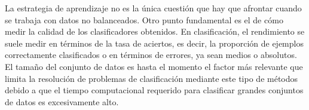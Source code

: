 			La estrategia de aprendizaje no es la única cuestión que hay que afrontar cuando se trabaja con datos no balanceados. Otro punto fundamental es el de cómo medir la calidad de los clasificadores obtenidos. En clasificación, el rendimiento se suele medir en términos de la tasa de aciertos, es decir, la proporción de ejemplos correctamente clasificados o en términos de errores, ya sean medios o absolutos. \\
			
			El tamaño del conjunto de datos es hasta el momento el factor más relevante que limita la resolución de problemas de clasificación mediante este tipo de métodos debido a que el tiempo computacional requerido para clasificar grandes conjuntos de datos es excesivamente alto.
		